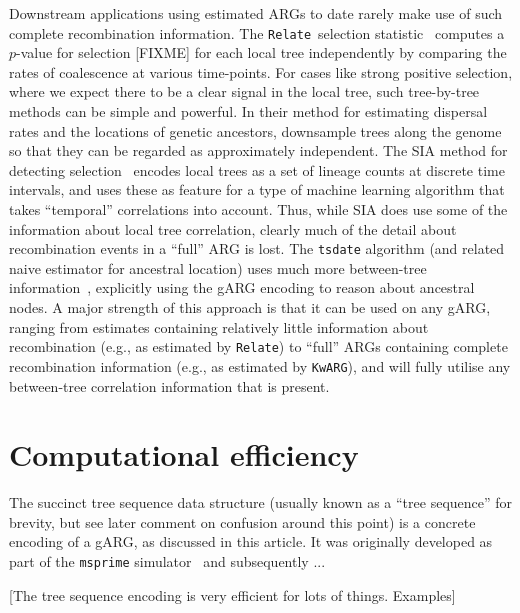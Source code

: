 \documentclass{article}
\newcommand{\kwarg}[0]{\texttt{KwARG}}
\newcommand{\relate}[0]{\texttt{Relate}}
\begin{document}

Downstream applications using estimated ARGs to date rarely
make use of such complete recombination information.
The \relate\ selection statistic~\citep{speidel2019method}
computes a $p$-value for selection [FIXME] for each
local tree independently by comparing the rates of coalescence
at various time-points. For cases like strong positive selection,
where we expect there to be a clear signal in the local tree,
such tree-by-tree methods can be simple and powerful.
In their method
for estimating dispersal rates and the locations of genetic
ancestors,
\citep{osmond2021estimating} downsample trees along the genome
so that they can be regarded as approximately independent.
The SIA method for detecting selection~\citep{hejase2022deep}
encodes local trees as a set of lineage counts at discrete
time intervals, and uses these as feature for a
type of machine learning algorithm
that takes ``temporal'' correlations into account. Thus,
while SIA does use some of the information about local tree correlation,
clearly much of the detail about recombination
events in a ``full'' ARG is lost.
The \texttt{tsdate} algorithm (and related naive estimator
for ancestral location) uses much more between-tree
information~\citep{wohns2022unified}, explicitly using the gARG
encoding to reason about ancestral nodes.
A major strength of this approach is that it can be used on
any gARG, ranging from estimates containing relatively little
information about recombination (e.g., as estimated by \relate)
to ``full'' ARGs containing complete recombination information
(e.g., as estimated by \kwarg), and will fully utilise
any between-tree correlation information that is present.

\section*{Computational efficiency}
The succinct tree sequence data structure (usually known as a ``tree sequence''
for brevity, but see later comment on confusion around this point)
is a concrete encoding of a gARG, as discussed in this article.
It was originally developed as part of the \texttt{msprime}
simulator~\cite{kelleher2016efficient} and subsequently ...

[The tree sequence encoding is very efficient for lots of things. Examples]
\end{document}
